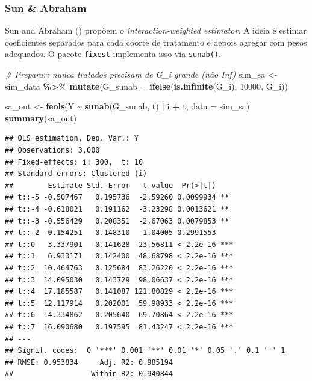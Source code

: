 \documentclass[
]{article}
\newenvironment{Shaded}{\begin{snugshade}}{\end{snugshade}}
\newcommand{\AttributeTok}[1]{\textcolor[rgb]{0.13,0.29,0.53}{#1}}
\newcommand{\CommentTok}[1]{\textcolor[rgb]{0.56,0.35,0.01}{\textit{#1}}}
\newcommand{\DecValTok}[1]{\textcolor[rgb]{0.00,0.00,0.81}{#1}}
\newcommand{\FunctionTok}[1]{\textcolor[rgb]{0.13,0.29,0.53}{\textbf{#1}}}
\newcommand{\NormalTok}[1]{#1}
\newcommand{\OtherTok}[1]{\textcolor[rgb]{0.56,0.35,0.01}{#1}}
\newcommand{\SpecialCharTok}[1]{\textcolor[rgb]{0.81,0.36,0.00}{\textbf{#1}}}
\begin{document}
\subsubsection{Sun \& Abraham}\label{sun-abraham}

Sun and Abraham () propõem o \emph{interaction-weighted estimator}. A ideia é estimar coeficientes separados para cada coorte de tratamento e depois agregar com pesos adequados. O pacote \texttt{fixest} implementa isso via \texttt{sunab()}.

\begin{Shaded}
\begin{Highlighting}[]
\CommentTok{\# Preparar: nunca tratados precisam de G\_i grande (não Inf)}
\NormalTok{sim\_sa }\OtherTok{\textless{}{-}}\NormalTok{ sim\_data }\SpecialCharTok{\%\textgreater{}\%}
  \FunctionTok{mutate}\NormalTok{(}\AttributeTok{G\_sunab =} \FunctionTok{ifelse}\NormalTok{(}\FunctionTok{is.infinite}\NormalTok{(G\_i), }\DecValTok{10000}\NormalTok{, G\_i))}

\NormalTok{sa\_out }\OtherTok{\textless{}{-}} \FunctionTok{feols}\NormalTok{(Y }\SpecialCharTok{\textasciitilde{}} \FunctionTok{sunab}\NormalTok{(G\_sunab, t) }\SpecialCharTok{|}\NormalTok{ i }\SpecialCharTok{+}\NormalTok{ t, }\AttributeTok{data =}\NormalTok{ sim\_sa)}
\FunctionTok{summary}\NormalTok{(sa\_out)}
\end{Highlighting}
\end{Shaded}

\begin{verbatim}
## OLS estimation, Dep. Var.: Y
## Observations: 3,000
## Fixed-effects: i: 300,  t: 10
## Standard-errors: Clustered (i) 
##        Estimate Std. Error   t value  Pr(>|t|)    
## t::-5 -0.507467   0.195736  -2.59260 0.0099934 ** 
## t::-4 -0.618021   0.191162  -3.23298 0.0013621 ** 
## t::-3 -0.556429   0.208351  -2.67063 0.0079853 ** 
## t::-2 -0.154251   0.148310  -1.04005 0.2991553    
## t::0   3.337901   0.141628  23.56811 < 2.2e-16 ***
## t::1   6.933171   0.142400  48.68798 < 2.2e-16 ***
## t::2  10.464763   0.125684  83.26220 < 2.2e-16 ***
## t::3  14.095030   0.143729  98.06637 < 2.2e-16 ***
## t::4  17.185587   0.141087 121.80829 < 2.2e-16 ***
## t::5  12.117914   0.202001  59.98933 < 2.2e-16 ***
## t::6  14.334862   0.205640  69.70864 < 2.2e-16 ***
## t::7  16.090680   0.197595  81.43247 < 2.2e-16 ***
## ---
## Signif. codes:  0 '***' 0.001 '**' 0.01 '*' 0.05 '.' 0.1 ' ' 1
## RMSE: 0.953834     Adj. R2: 0.985194
##                  Within R2: 0.940844
\end{verbatim}
\end{document}
